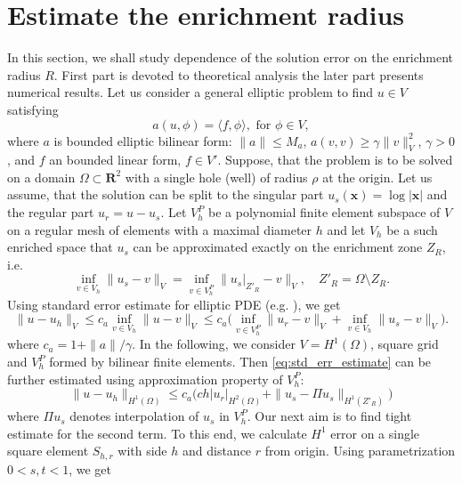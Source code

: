 \documentclass[preprint,12pt]{elsarticle}
\def\vc#1{\mathbf{\boldsymbol{#1}}}     %
\def\abs#1{\left|#1\right|}
\def\norm#1{\| #1 \|}
\def\abs#1{| #1 |}
\newcommand{\R}{\mathbf{R}}
\begin{document}
\section{Estimate the enrichment radius} \label{sec:enrichemnt_radius}
In this section, we shall study dependence of the solution error on the enrichment radius $R$. First part is devoted to 
theoretical analysis the later part presents numerical results.
Let us consider a general elliptic problem to find $u\in V$ satisfying
\[
   a(u, \phi) = \langle f, \phi \rangle, \text{ for } \phi \in V,
\]
where $a$ is bounded elliptic bilinear form: $\norm{a}\le M_a$, $a(v, v) \ge \gamma \norm{v}_V^2$, $\gamma>0$, and $f$ an bounded linear form, $f\in V'$. 
Suppose, that the problem is to be solved on a domain $\Omega \subset \R^2$ with a single hole (well) of radius $\rho$ at the origin. 
Let us assume, that the solution can be split to the singular part $u_s(\vc x)= \log |\vc x|$ and the regular part $u_r=u-u_s$.
Let $V^P_h$ be a polynomial finite element subspace of $V$ on a regular mesh of elements with a maximal diameter $h$
and let $V_h$ be a such enriched space that $u_s$ can be approximated exactly on the enrichment zone $Z_R$, i.e.
\[
   \inf_{v\in V_h} \norm{u_s - v}_V = \inf_{v\in V^P_h} \norm{u_s|_{Z'_R} - v}_V, \quad Z'_R = \Omega\setminus Z_R.
\]
Using standard error estimate for elliptic PDE (e.g. \cite[Theorem 13.1]{ciarlet_basic_1991}), we get
\begin{equation}
    \label{eq:std_err_estimate}
    \norm{u - u_h}_{V} \le c_a \inf_{v \in V_h} \norm{u - v}_{V} 
    \le c_a \big(\inf_{v \in V^P_h} \norm{u_r - v}_{V} + \inf_{v \in V_h} \norm{u_s - v}_{V} \big).   
\end{equation}
where $c_a=1+\norm{a}/\gamma$.
In the following, we consider $V=H^1(\Omega)$, square grid and $V^P_h$ formed by bilinear finite elements. 
Then \eqref{eq:std_err_estimate} can be further estimated using approximation property of $V^P_h$:
\begin{equation}
    \label{eq:particular_estimate}
    \norm{u - u_h}_{H^1(\Omega)} \le c_a \big(c h \abs{u_r}_{H^2(\Omega)} + \norm{u_s - \Pi u_s}_{H^1(Z'_R)} \big)   
\end{equation}
where $\Pi u_s$ denotes interpolation of $u_s$ in $V^P_h$. Our next aim is to find tight estimate for the second term.
To this end, we calculate $H^1$ error on a single square element $S_{h,r}$ with side $h$ and distance $r$ from origin.
Using parametrization $0<s,t<1$,  we get
\end{document}
